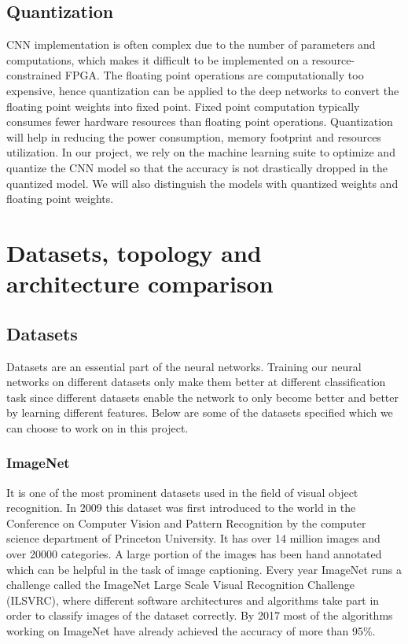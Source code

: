 \documentclass[titlepage]{report}
\begin{document}
\section{Quantization }
CNN implementation is often complex due to the number of parameters and computations, which makes it difficult to be implemented on a resource-constrained FPGA. The floating point operations are computationally too expensive, hence quantization can be applied to the deep networks to convert the floating point weights into fixed point. Fixed point computation typically consumes fewer hardware resources than floating point operations. Quantization will help in reducing the power consumption, memory footprint and resources utilization. In our project, we rely on the machine learning suite to optimize and quantize the CNN model so that the accuracy is not drastically dropped in the quantized model. We will also distinguish the models with quantized weights and floating point weights.


\chapter{Datasets, topology and architecture comparison}

\section{Datasets}
Datasets are an essential part of the neural networks. Training our neural networks on different datasets only make them better at different classification task since different datasets enable the network to only become better and better by learning different features. Below are some of the datasets specified which we can choose to work on in this project.

\subsection{ImageNet}
It is one of the most prominent datasets used in the field of visual object recognition. In 2009 this dataset was first introduced to the world in the Conference on Computer Vision and Pattern Recognition by the computer science department of  Princeton University. It has over 14 million images and over 20000 categories. A large portion of the images has been hand annotated which can be helpful in the task of image captioning. Every year ImageNet runs a challenge called the ImageNet Large Scale Visual Recognition Challenge (ILSVRC), where different software architectures and algorithms take part in order to classify images of the dataset correctly. By 2017 most of the algorithms working on ImageNet have already achieved the accuracy of more than 95\%.
\end{document}
